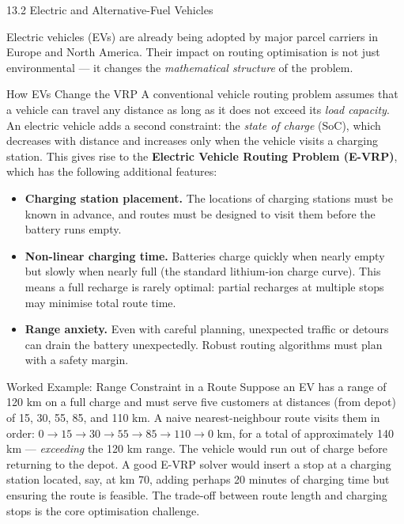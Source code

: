 \documentclass[aspectratio=169,10pt]{beamer}
\begin{document}
\begin{frame}[allowframebreaks]{13.2 Electric and Alternative-Fuel Vehicles}

  Electric vehicles (EVs) are already being adopted by major parcel
  carriers in Europe and North America.  Their impact on routing
  optimisation is not just environmental --- it changes the
  \emph{mathematical structure} of the problem.

  \bigskip
  \begin{block}{How EVs Change the VRP}
    A conventional vehicle routing problem assumes that a vehicle
    can travel any distance as long as it does not exceed its
    \emph{load capacity}.  An electric vehicle adds a second
    constraint: the \emph{state of charge} (SoC), which decreases
    with distance and increases only when the vehicle visits a
    charging station.  This gives rise to the
    \textbf{Electric Vehicle Routing Problem (E-VRP)}, which has
    the following additional features:

    \medskip
    \begin{itemize}
      \item \textbf{Charging station placement.}
            The locations of charging stations must be known in
            advance, and routes must be designed to visit them
            before the battery runs empty.

      \item \textbf{Non-linear charging time.}
            Batteries charge quickly when nearly empty but slowly
            when nearly full (the standard lithium-ion charge curve).
            This means a full recharge is rarely optimal: partial
            recharges at multiple stops may minimise total route time.

      \item \textbf{Range anxiety.}
            Even with careful planning, unexpected traffic or
            detours can drain the battery unexpectedly.
            Robust routing algorithms must plan with a safety margin.
    \end{itemize}
  \end{block}

  \bigskip
  \begin{exampleblock}{Worked Example: Range Constraint in a Route}
    Suppose an EV has a range of 120 km on a full charge and must
    serve five customers at distances (from depot) of 15, 30, 55,
    85, and 110 km.  A naive nearest-neighbour route visits them
    in order: $0 \to 15 \to 30 \to 55 \to 85 \to 110 \to 0$ km,
    for a total of approximately 140 km --- \emph{exceeding} the
    120 km range.  The vehicle would run out of charge before
    returning to the depot.  A good E-VRP solver would insert a
    stop at a charging station located, say, at km 70, adding
    perhaps 20 minutes of charging time but ensuring the route
    is feasible.  The trade-off between route length and
    charging stops is the core optimisation challenge.
  \end{exampleblock}


\end{frame}
\end{document}
